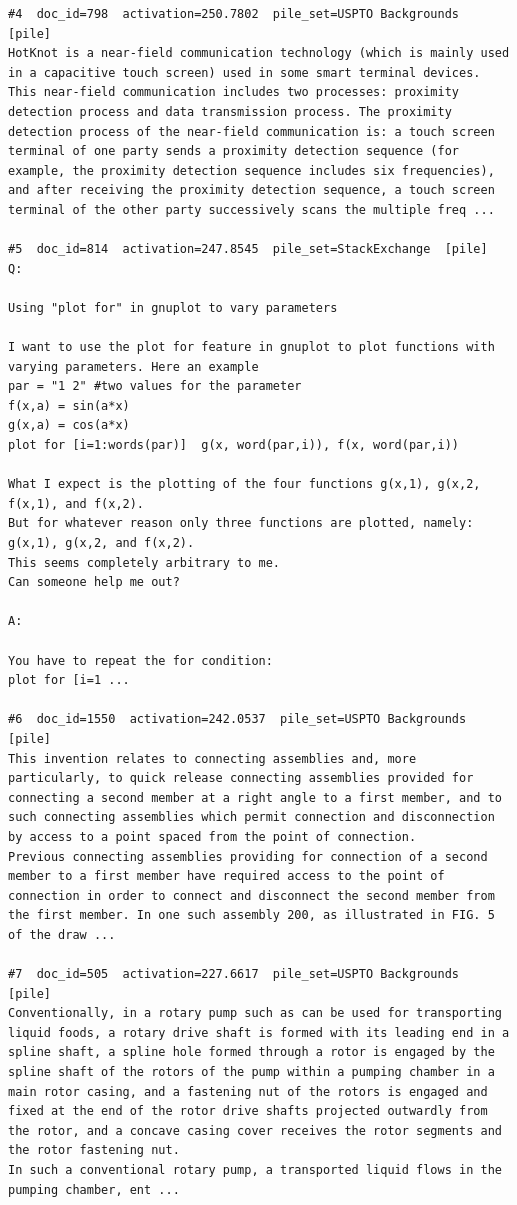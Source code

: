 \begin{verbatim}
#4  doc_id=798  activation=250.7802  pile_set=USPTO Backgrounds  [pile]
HotKnot is a near-field communication technology (which is mainly used in a capacitive touch screen) used in some smart terminal devices. This near-field communication includes two processes: proximity detection process and data transmission process. The proximity detection process of the near-field communication is: a touch screen terminal of one party sends a proximity detection sequence (for example, the proximity detection sequence includes six frequencies), and after receiving the proximity detection sequence, a touch screen terminal of the other party successively scans the multiple freq ...

#5  doc_id=814  activation=247.8545  pile_set=StackExchange  [pile]
Q:

Using "plot for" in gnuplot to vary parameters

I want to use the plot for feature in gnuplot to plot functions with varying parameters. Here an example
par = "1 2" #two values for the parameter
f(x,a) = sin(a*x)
g(x,a) = cos(a*x)
plot for [i=1:words(par)]  g(x, word(par,i)), f(x, word(par,i))

What I expect is the plotting of the four functions g(x,1), g(x,2, f(x,1), and f(x,2).
But for whatever reason only three functions are plotted, namely: g(x,1), g(x,2, and f(x,2).
This seems completely arbitrary to me.
Can someone help me out?

A:

You have to repeat the for condition:
plot for [i=1 ...

#6  doc_id=1550  activation=242.0537  pile_set=USPTO Backgrounds  [pile]
This invention relates to connecting assemblies and, more particularly, to quick release connecting assemblies provided for connecting a second member at a right angle to a first member, and to such connecting assemblies which permit connection and disconnection by access to a point spaced from the point of connection.
Previous connecting assemblies providing for connection of a second member to a first member have required access to the point of connection in order to connect and disconnect the second member from the first member. In one such assembly 200, as illustrated in FIG. 5 of the draw ...

#7  doc_id=505  activation=227.6617  pile_set=USPTO Backgrounds  [pile]
Conventionally, in a rotary pump such as can be used for transporting liquid foods, a rotary drive shaft is formed with its leading end in a spline shaft, a spline hole formed through a rotor is engaged by the spline shaft of the rotors of the pump within a pumping chamber in a main rotor casing, and a fastening nut of the rotors is engaged and fixed at the end of the rotor drive shafts projected outwardly from the rotor, and a concave casing cover receives the rotor segments and the rotor fastening nut.
In such a conventional rotary pump, a transported liquid flows in the pumping chamber, ent ...


\end{verbatim}
